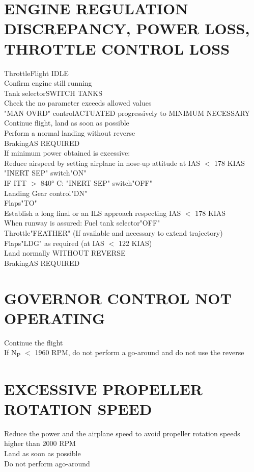 \documentclass{article}
\begin{document}
\begin{multicols*}{2}
\section*{ENGINE REGULATION DISCREPANCY, POWER LOSS, THROTTLE CONTROL LOSS}
Throttle\dotfill Flight IDLE\\
Confirm engine still running\\
Tank selector\dotfill SWITCH TANKS\\
Check the no parameter exceeds allowed values\\
"MAN OVRD" control\dotfill ACTUATED progressively to MINIMUM NECESSARY\\
Continue flight, land as soon as possible\\
Perform a normal landing without reverse\\
Braking\dotfill AS REQUIRED\\
If minimum power obtained is excessive:\\
Reduce airspeed by setting airplane in nose-up attitude at IAS $<$ 178 KIAS\\
"INERT SEP" switch\dotfill "ON"\\
IF ITT $>$ 840° C: "INERT SEP" switch\dotfill "OFF"\\
Landing Gear control\dotfill "DN"\\
Flaps\dotfill "TO"\\
Establish a long final or an ILS approach respecting IAS $<$ 178 KIAS\\
When runway is assured: Fuel tank selector\dotfill "OFF"\\
Throttle\dotfill "FEATHER" (If available and necessary to extend trajectory)\\
Flaps\dotfill "LDG" as required (at IAS $<$ 122 KIAS)\\
Land normally WITHOUT REVERSE\\
Braking\dotfill AS REQUIRED
\section*{GOVERNOR CONTROL NOT OPERATING}
Continue the flight\\
If N\textsubscript{P} $<$ 1960 RPM, do not perform a go-around and do not use the reverse
\section*{EXCESSIVE PROPELLER ROTATION SPEED}
Reduce the power and the airplane speed to avoid propeller rotation speeds higher than 2000 RPM\\
Land as soon as possible\\
Do not perform ago-around

\end{multicols*}
\end{document}
